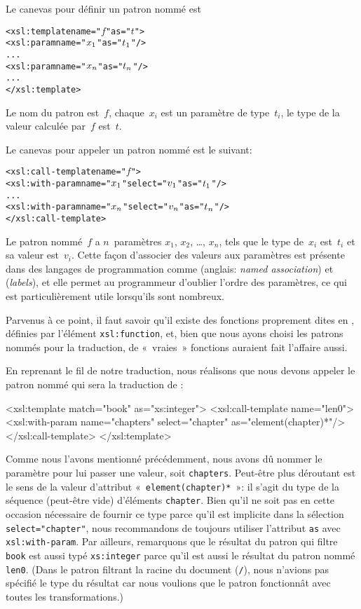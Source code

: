 Le canevas pour définir un patron nommé est
\begin{alltt}
\small<xsl:template name="\(f\)" as="\(t\)">
  <xsl:param name="\(x\sb{1}\)" as="\(t\sb{1}\)"/>
  ...
  <xsl:param name="\(x\sb{n}\)" as="\(t\sb{n}\)"/>
  ...
</xsl:template>
\end{alltt}
Le nom du patron est~\(f\), chaque~\(x_i\) est un paramètre de
type~\(t_i\), le type de la valeur calculée par~\(f\) est~\(t\).

Le canevas pour appeler un patron nommé est le suivant:
\begin{alltt}
\small<xsl:call-template name="\(f\)">
  <xsl:with-param name="\(x\sb{1}\)" select="\(v\sb{1}\)" as="\(t\sb{1}\)"/>
  ...
  <xsl:with-param name="\(x\sb{n}\)" select="\(v\sb{n}\)" as="\(t\sb{n}\)"/>
</xsl:call-template>
\end{alltt}
Le patron nommé~\(f\) a \(n\)~paramètres \(x_1\), \(x_2\), \ldots,
\(x_n\), tels que le type de~\(x_i\) est~\(t_i\) et sa valeur
est~\(v_i\). Cette façon d'associer des valeurs aux paramètres est
présente dans des langages de programmation comme \Ada (anglais:
\emph{named association}) et \OCaml (\emph{labels}), et elle permet au
programmeur d'oublier l'ordre des paramètres, ce qui est
particulièrement utile lorsqu'ils sont nombreux.

Parvenus à ce point, il faut savoir qu'il existe des fonctions
proprement dites en \XSLT, définies par l'élément
\texttt{xsl:function}, et, bien que nous ayons choisi les patrons
nommés pour la traduction, de «~vraies~» fonctions \XSLT auraient fait
l'affaire aussi.

En reprenant le fil de notre traduction, nous réalisons que nous
devons appeler le patron nommé qui sera la traduction de :
\begin{sverb}
  <xsl:template match="book" as="xs:integer">
    <xsl:call-template name="len0">
      <xsl:with-param name="chapters" select="chapter"
                      as="element(chapter)*"/>
    </xsl:call-template>
  </xsl:template>
\end{sverb}
Comme nous l'avons mentionné précédemment, nous avons dû nommer le
paramètre pour lui passer une valeur, soit
\texttt{chapters}. Peut-être plus déroutant est le sens de la valeur
d'attribut «~\texttt{element(chapter)*}~»: il s'agit du type de la
séquence (peut-être vide) d'éléments \texttt{chapter}. Bien qu'il ne
soit pas en cette occasion nécessaire de fournir ce type parce qu'il
est implicite dans la sélection \texttt{select="chapter"}, nous
recommandons de toujours utiliser l'attribut \texttt{as} avec
\texttt{xsl:with-param}. Par ailleurs, remarquons que le résultat du
patron qui filtre \texttt{book} est aussi typé \texttt{xs:integer}
parce qu'il est aussi le résultat du patron nommé \texttt{len0}. (Dans
le patron filtrant la racine du document (\texttt{/}), nous n'avions
pas spécifié le type du résultat car nous voulions que le patron
fonctionnât avec toutes les transformations.)

